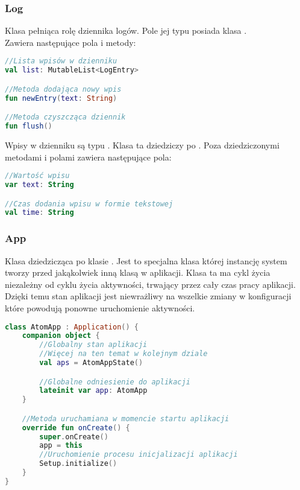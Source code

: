 \subsubsection{Log}
Klasa pełniąca rolę dziennika logów. Pole jej typu posiada klasa .\\
Zawiera następujące pola i metody:

\begin{lstlisting}[language=Kotlin]
//Lista wpisów w dzienniku
val list: MutableList<LogEntry>

//Metoda dodająca nowy wpis
fun newEntry(text: String)

//Metoda czyszcząca dziennik
fun flush()
\end{lstlisting}

Wpisy w dzienniku są typu . Klasa ta dziedziczy po .
Poza dziedziczonymi metodami i polami zawiera następujące pola:

\begin{lstlisting}[language=Kotlin]
//Wartość wpisu
var text: String

//Czas dodania wpisu w formie tekstowej
val time: String
\end{lstlisting}

\newpage

\subsubsection{App}
Klasa dziedzicząca po klasie . Jest to specjalna klasa której instancję system tworzy przed jakąkolwiek inną klasą w aplikacji. Klasa ta ma cykl życia niezależny od cyklu życia aktywności, trwający przez cały czas pracy aplikacji. Dzięki temu stan aplikacji jest niewrażliwy na wszelkie zmiany w konfiguracji które powodują ponowne uruchomienie aktywności.

\begin{lstlisting}[language=Kotlin]
class AtomApp : Application() {
    companion object {
        //Globalny stan aplikacji
        //Więcej na ten temat w kolejnym dziale
        val aps = AtomAppState()

        //Globalne odniesienie do aplikacji
        lateinit var app: AtomApp
    }

    //Metoda uruchamiana w momencie startu aplikacji
    override fun onCreate() {
        super.onCreate()
        app = this
        //Uruchomienie procesu inicjalizacji aplikacji
        Setup.initialize()
    }
}
\end{lstlisting}

